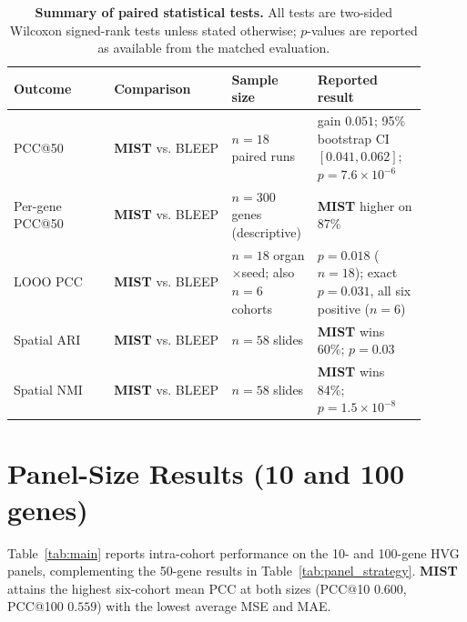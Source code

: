\documentclass[11pt]{article}
\newcommand{\morph}{\textbf{MIST}}
\begin{document}
\begin{table}[H]
\centering
\caption{\textbf{Summary of paired statistical tests.} All tests are two-sided Wilcoxon signed-rank
tests unless stated otherwise; $p$-values are reported as available from the matched evaluation.}
\label{tab:paired_tests}
\small
\setlength{\tabcolsep}{4pt}
\begin{tabular}{p{0.23\linewidth}p{0.27\linewidth}p{0.15\linewidth}p{0.25\linewidth}}
\toprule
Outcome & Comparison & Sample size & Reported result \\
\midrule
PCC@50 & \morph{} vs. BLEEP & $n=18$ paired runs & gain $0.051$; 95\% bootstrap CI $[0.041,0.062]$; $p=7.6\times10^{-6}$ \\
Per-gene PCC@50 & \morph{} vs. BLEEP & $n=300$ genes (descriptive) & \morph{} higher on 87\% \\
LOOO PCC & \morph{} vs. BLEEP & $n=18$ organ$\times$seed; also $n=6$ cohorts & $p=0.018$ ($n{=}18$); exact $p=0.031$, all six positive ($n{=}6$) \\
Spatial ARI & \morph{} vs. BLEEP & $n=58$ slides & \morph{} wins 60\%; $p=0.03$ \\
Spatial NMI & \morph{} vs. BLEEP & $n=58$ slides & \morph{} wins 84\%; $p=1.5\times10^{-8}$ \\
\bottomrule
\end{tabular}
\end{table}

\section{Panel-Size Results (10 and 100 genes)}
\label{app:panelsize}
Table~\ref{tab:main} reports intra-cohort performance on the 10- and 100-gene HVG panels,
complementing the 50-gene results in Table~\ref{tab:panel_strategy}. \morph{} attains the highest
six-cohort mean PCC at both sizes (PCC@10 $0.600$, PCC@100 $0.559$) with the lowest average MSE and MAE.
\end{document}
